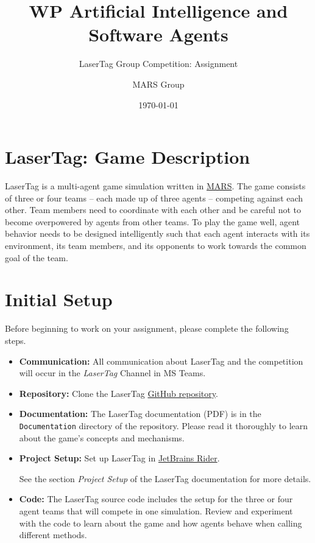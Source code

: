\documentclass[
    a4paper,
    english,
    DIV=16,
    11pt,
    parskip=half,
]{scrartcl}
\title{WP Artificial Intelligence and Software Agents}
\subtitle{LaserTag Group Competition: Assignment}
\author{MARS Group}
\date{\today}
\begin{document}
\maketitle
\section*{LaserTag: Game Description}
LaserTag is a multi-agent game simulation written in \href{https://mars-group-haw.github.io/index.html}{MARS}. The game consists of three or four teams -- each made up of three agents -- competing against each other. Team members need to coordinate with each other and be careful not to become overpowered by agents from other teams. To play the game well, agent behavior needs to be designed intelligently such that each agent interacts with its environment, its team members, and its opponents to work towards the common goal of the team.

\section*{Initial Setup}

Before beginning to work on your assignment, please complete the following steps.

\begin{itemize}
  \item \textbf{Communication:} All communication about LaserTag and the competition will occur in the \emph{LaserTag} Channel in MS Teams.
  \item \textbf{Repository:} Clone the LaserTag \href{https://github.com/MARS-Group-HAW/model-mars-laser-tag-game}{GitHub repository}.
  \item \textbf{Documentation:} The LaserTag documentation (PDF) is in the \texttt{Documentation} directory of the repository. Please read it thoroughly to learn about the game's concepts and mechanisms.
  \item \textbf{Project Setup:} Set up LaserTag in \href{https://www.jetbrains.com/rider/}{JetBrains Rider}.
  
  \faLightbulbO\: See the section \emph{Project Setup} of the LaserTag documentation for more details.
  \item \textbf{Code:} The LaserTag source code includes the setup for the three or four agent teams that will compete in one simulation. Review and experiment with the code to learn about the game and how agents behave when calling different methods.
\end{itemize}
\end{document}
